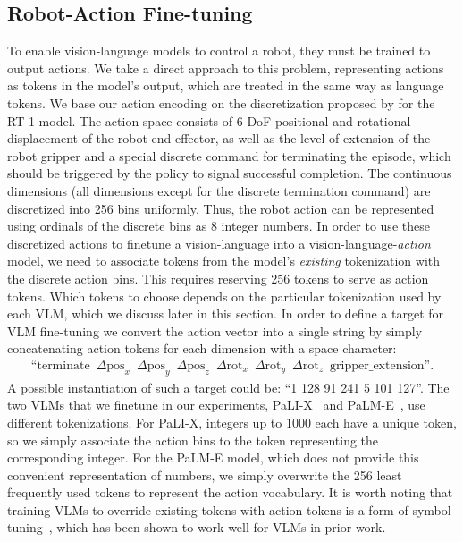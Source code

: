 \subsection{Robot-Action Fine-tuning}
\label{sec:action_ft}

To enable vision-language models to control a robot, they must be trained to output actions. We take a direct approach to this problem, representing actions as tokens in the model's output, which are treated in the same way as language tokens. We base our action encoding on the discretization proposed by \citet{brohan2022rt} for the RT-1 model. The action space consists of 6-DoF positional and rotational displacement of the robot end-effector, as well as the level of extension of the robot gripper and a special discrete command for terminating the episode, which should be triggered by the policy to signal successful completion. The continuous dimensions (all dimensions except for the discrete termination command) are discretized into 256 bins uniformly. Thus, the robot action can be represented using ordinals of the discrete bins as 8 integer numbers. In order to use these discretized actions to finetune a vision-language into a vision-language-\emph{action} model, we need to associate tokens from the model's \emph{existing} tokenization with the discrete action bins. This requires reserving 256 tokens to serve as action tokens. Which tokens to choose depends on the particular tokenization used by each VLM, which we discuss later in this section. In order to define a target for VLM fine-tuning we convert the action vector into a single string by simply concatenating action tokens for each dimension with a space character:
\begin{align*}
    \text{``terminate} \enspace \Delta \text{pos}_x \enspace \Delta \text{pos}_y \enspace \Delta \text{pos}_z \enspace \Delta \text{rot}_x \enspace \Delta \text{rot}_y \enspace \Delta \text{rot}_z \enspace \text{gripper\_extension''}.
\end{align*}
A possible instantiation of such a target could be: ``1 128 91 241 5 101 127''. The two VLMs that we finetune in our experiments, PaLI-X~\citep{chen2023palix} and PaLM-E~\citep{driess2023palm}, use different tokenizations. For PaLI-X, integers up to 1000 each have a unique token, so we simply associate the action bins to the token representing the corresponding integer. For the PaLM-E model, which does not provide this convenient representation of numbers, we simply overwrite the 256 least frequently used tokens to represent the action vocabulary.
It is worth noting that training VLMs to override existing tokens with action tokens is a form of symbol tuning~\citep{wei2023symbol}, which has been shown to work well for VLMs in prior work.


